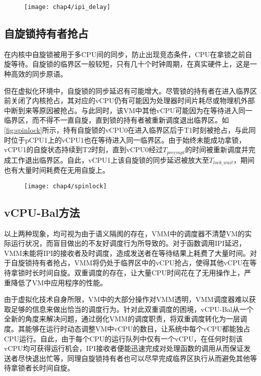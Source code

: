 \begin{figure}[!htp]
  \centering
  \texttt{[image: chap4/ipi\_delay]}
\end{figure}

\subsection{自旋锁持有者抢占}

在内核中自旋锁被用于多CPU间的同步，防止出现竞态条件，CPU在拿锁之前自旋等待。自旋锁的临界区一般较短，只有几十个时钟周期，在真实硬件上，这是一种高效的同步原语\cite{anderson1990performance}。

但在虚拟化环境中，自旋锁的同步延迟有可能增大。尽管锁的持有者在进入临界区前关闭了内核抢占，其对应的vCPU仍有可能因为处理器时间片耗尽或物理机外部中断到来等原因被抢占。与此同时，该VM中其他vCPU可能因为在等待进入同一临界区，而不得不一直自旋，直到锁的持有者被重新调度退出临界区。如\ref{fig:spinlock}所示，持有自旋锁的vCPU0在进入临界区后于T1时刻被抢占，与此同时位于pCPU1上的vCPU1也在等待进入同一临界区。由于始终未能成功拿锁，vCPU1的自旋状态持续到T2时刻，直到vCPU0经过$T_{preempt}$的时间被重新调度并完成工作退出临界区。自此，vCPU1上该自旋锁的同步延迟被放大至$T_{lock\_wait}$，期间也有大量时间耗费在无用自旋上。

\begin{figure}[!htp]
  \centering
  \texttt{[image: chap4/spinlock]}
\end{figure}

\subsection{vCPU-Bal方法}

以上两种现象，均可视为由于语义隔阂的存在，VMM中的调度器不清楚VM的实际运行状况，而盲目做出的不友好调度行为所导致的。对于函数调用IPI延迟，VMM未能将IPI的接收者及时调度，造成发送者在等待结果上耗费了大量时间。对于自旋锁持有者抢占，VMM将仍处于临界区中的vCPU抢占，使得其他vCPU在等待拿锁时长时间自旋。双重调度的存在，让大量CPU时间花在了无用操作上，严重降低了VM中应用程序的性能。

由于虚拟化技术自身所限，VM中的大部分操作对VMM透明，VMM调度器难以获取足够的信息来做出恰当的调度行为。针对此双重调度的困境，vCPU-Bal从一个全新的角度来解决问题\cite{song2013schedule}，通过弱化VMM的调度职责，将双重调度转化为一层调度。其能够在运行时动态调整VM中vCPU的数目，让系统中每个vCPU都能独占CPU运行。自此，由于每个CPU的运行队列中仅有一个vCPU，在任何时刻该vCPU均可获得运行机会，IPI接收者便能迅速完成对处理函数的调用从而保证发送者尽快退出忙等，同理自旋锁持有者也可以尽早完成临界区执行从而避免其他等待拿锁者长时间自旋。

